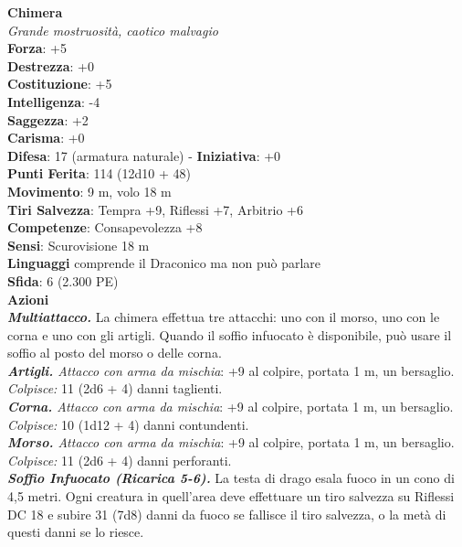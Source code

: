 \begin{multicols}{2}
\medskip\textbf{Chimera}\\
\emph{Grande mostruosità, caotico malvagio}\\
\textbf{Forza}: +5\\
\textbf{Destrezza}: +0\\
\textbf{Costituzione}: +5\\
\textbf{Intelligenza}: -4\\
\textbf{Saggezza}: +2\\
\textbf{Carisma}: +0\\
\textbf{Difesa}: 17 (armatura naturale) - \textbf{Iniziativa}: +0\\
\textbf{Punti Ferita}: 114 (12d10 + 48)\\
\textbf{Movimento}: 9 m, volo 18 m\\
\textbf{Tiri Salvezza}: Tempra +9, Riflessi +7, Arbitrio +6\\
\textbf{Competenze}: Consapevolezza +8\\
\textbf{Sensi}: Scurovisione 18 m\\
\textbf{Linguaggi} comprende il Draconico ma non può parlare\\
\textbf{Sfida}: 6 (2.300 PE)\smallskip\\
\smallskip\textbf{Azioni}\\
\emph{\textbf{Multiattacco.}} La chimera effettua tre attacchi: uno con il morso, uno con le corna e uno con gli artigli. Quando il soffio infuocato è disponibile, può usare il soffio al posto del morso o delle corna.\\
\emph{\textbf{Artigli.} Attacco con arma da mischia}: +9 al colpire, portata 1 m, un bersaglio. \\
\emph{Colpisce:} 11 (2d6 + 4) danni taglienti.\\
\emph{\textbf{Corna.} Attacco con arma da mischia}: +9 al colpire, portata 1 m, un bersaglio.\\
\emph{Colpisce:} 10 (1d12 + 4) danni contundenti.\\
\emph{\textbf{Morso.} Attacco con arma da mischia}: +9 al colpire, portata 1 m, un bersaglio.\\
\emph{Colpisce:} 11 (2d6 + 4) danni perforanti.\\
\emph{\textbf{Soffio Infuocato (Ricarica 5-6).}} La testa di drago esala fuoco in un cono di 4,5 metri. Ogni creatura in quell'area deve effettuare un tiro salvezza su Riflessi DC  18 e subire 31 (7d8) danni da fuoco se fallisce il tiro salvezza, o la metà di questi danni se lo riesce.\\

\end{multicols}

